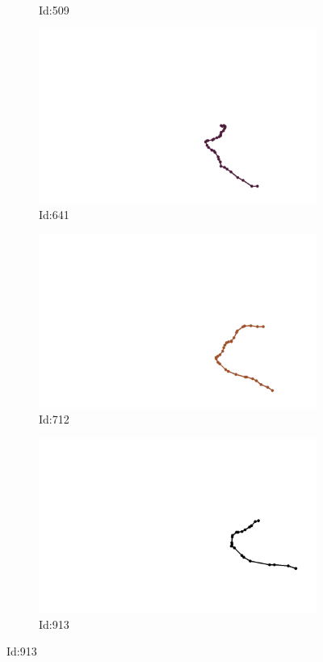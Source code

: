 \documentclass[12pt,twoside]{report}
\begin{document}
\begin{figure}
\begin{subfigure}[b]{0.20\textwidth}
\caption{Id:509}
\end{subfigure}
\begin{subfigure}[b]{0.20\textwidth}
\centering
\includegraphics[width=\textwidth]{../../trajectories/641.png}
\caption{Id:641}
\end{subfigure}
\begin{subfigure}[b]{0.20\textwidth}
\centering
\includegraphics[width=\textwidth]{../../trajectories/712.png}
\caption{Id:712}
\end{subfigure}
\begin{subfigure}[b]{0.20\textwidth}
\centering
\includegraphics[width=\textwidth]{../../trajectories/913.png}
\caption{Id:913}
\end{subfigure}
\end{figure}
\end{document}
